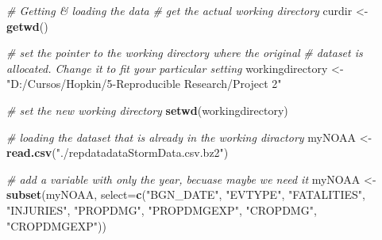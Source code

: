 \documentclass[12pt,spanish, american,b4paper, onecolumn, lmargin=1cm, rmargin=1cm, tmargin=1cm, bmargin=2cm,]{article}
\newenvironment{Shaded}{}{}
\newcommand{\KeywordTok}[1]{\textbf{{#1}}}
\newcommand{\DataTypeTok}[1]{\textcolor[rgb]{0.50,0.00,0.00}{{#1}}}
\newcommand{\StringTok}[1]{\textcolor[rgb]{0.87,0.00,0.00}{{#1}}}
\newcommand{\CommentTok}[1]{\textcolor[rgb]{0.50,0.50,0.50}{\textit{{#1}}}}
\newcommand{\NormalTok}[1]{{#1}}
\begin{document}
\begin{Shaded}
\begin{Highlighting}[]
\CommentTok{# Getting & loading the data}
\CommentTok{# get the actual working directory}
\NormalTok{curdir <-}\StringTok{ }\KeywordTok{getwd}\NormalTok{()}

\CommentTok{# set the pointer to the working directory where the original }
\CommentTok{# dataset is allocated. Change it to fit your particular setting}
\NormalTok{workingdirectory <-}\StringTok{ "D:/Cursos/Hopkin/5-Reproducible Research/Project 2"}

\CommentTok{# set the new working directory}
\KeywordTok{setwd}\NormalTok{(workingdirectory)}

\CommentTok{# loading the dataset that is already in the working diractory }
\NormalTok{myNOAA <-}\StringTok{ }\KeywordTok{read.csv}\NormalTok{(}\StringTok{"./repdatadataStormData.csv.bz2"}\NormalTok{)}

\CommentTok{# add a variable with only the year, becuase maybe we need it}
\NormalTok{myNOAA <-}\StringTok{ }\KeywordTok{subset}\NormalTok{(myNOAA, }\DataTypeTok{select=}\KeywordTok{c}\NormalTok{(}\StringTok{"BGN_DATE"}\NormalTok{,}
                                  \StringTok{"EVTYPE"}\NormalTok{,}
                                  \StringTok{"FATALITIES"}\NormalTok{,}
                                  \StringTok{"INJURIES"}\NormalTok{,}
                                  \StringTok{"PROPDMG"}\NormalTok{,}
                                  \StringTok{"PROPDMGEXP"}\NormalTok{,}
                                  \StringTok{"CROPDMG"}\NormalTok{,}
                                  \StringTok{"CROPDMGEXP"}\NormalTok{))}
\end{Highlighting}
\end{Shaded}
\end{document}
